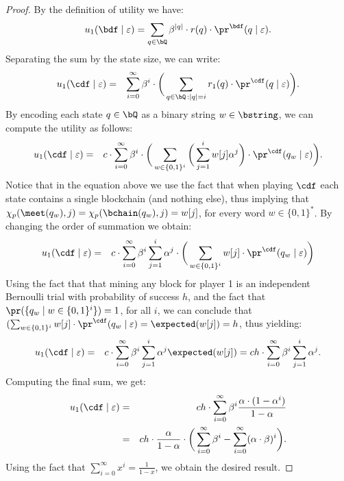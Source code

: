 \begin{proof}
By the definition of utility we have:
$$u_1(\bdf\mid\varepsilon) = \sum_{q\in \bQ}\beta^{|q|}\cdot r(q)\cdot \pr^{\bdf}(q\mid \varepsilon).$$
Separating the sum by the state size, we can write:
\begin{eqnarray*}
u_1(\cdf \mid \varepsilon) & = & \sum_{i=0}^{\infty}\beta^{i} \cdot  \bigg(\sum_{\substack{q \in \bQ \,: |q| = i}} r_1(q) \cdot 
\pr^{\cdf}(q \mid \varepsilon)\bigg).
\end{eqnarray*}
By encoding each state $q\in\bQ$ as a binary string $w\in \bstring$, we can compute the utility as follows:
\begin{eqnarray*}
u_1(\cdf \mid \varepsilon)& = & c\cdot \sum_{i=0}^{\infty}\beta^{i} \cdot\bigg(\sum_{w\in\{0,1\}^i}  \bigg( \sum_{j=1}^{i}w[j] \alpha^j \bigg)\cdot 
\pr^{\cdf}(q_w \mid \varepsilon)\bigg).
\end{eqnarray*}
Notice that in the equation above we use the fact that when playing $\cdf$ each state contains a single blockchain (and nothing else), thus implying that $\chi_p(\meet(q_w),j) = \chi_p(\bchain(q_w),j) = w[j]$, for every word $w\in \{0,1\}^*$. By changing the order of summation we obtain:
\begin{eqnarray*}
u_1(\cdf \mid \varepsilon)& = &c\cdot \sum_{i=0}^{\infty}\beta^{i}\sum_{j=1}^{i} \alpha^j \cdot\bigg(\sum_{w\in\{0,1\}^i}   w[j]\cdot 
\pr^{\cdf}(q_w \mid \varepsilon)\bigg)
\end{eqnarray*}
Using the fact that that mining any block for player 1 is an independent Bernoulli trial with probability of success $h$, and the fact that $\pr(\{q_w \mid w\in \{0,1\}^i \})=1$, for all $i$, we can conclude that $(\sum_{w\in\{0,1\}^i}   w[j]\cdot \pr^{\cdf}(q_w \mid \varepsilon) = \expected(w[j]) = h$, thus yielding:
\begin{eqnarray*}	
u_1(\cdf \mid \varepsilon) & = & c\cdot \sum_{i=0}^{\infty}\beta^{i}\sum_{j=1}^{i} \alpha^j \expected(w[j]) = ch\cdot \sum_{i=0}^{\infty}\beta^{i}\sum_{j=1}^{i} \alpha^j .
\end{eqnarray*}
Computing the final sum, we get:
\begin{eqnarray*}	
u_1(\cdf \mid \varepsilon) & = & ch\cdot \sum_{i=0}^{\infty}\beta^{i}\frac{\alpha\cdot (1-\alpha^i)}{1-\alpha}\\
 & = & ch\cdot \frac{\alpha}{1-\alpha} \cdot \bigg(\sum_{i=0}^{\infty}\beta^{i} - \sum_{i=0}^{\infty}(\alpha \cdot \beta)^i \bigg).
\end{eqnarray*}
Using the fact that $\sum_{i=0}^{\infty}x^i= \frac{1}{1-x}$, we obtain the desired result.
\end{proof}

